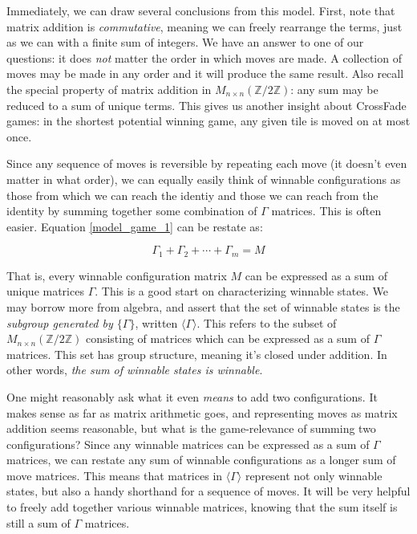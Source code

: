 \documentclass{article}[12pt]
\newcommand{\group}[1]{M_{#1 \times #1}(\mathbb{Z}/2\mathbb{Z})}
\begin{document}
Immediately, we can draw several conclusions from this model.  First, note that matrix addition is \emph{commutative}, meaning we can freely rearrange the terms, just as we can with a finite sum of integers.  We have an answer to one of our questions: it does \emph{not} matter the order in which moves are made.  A collection of moves may be made in any order and it will produce the same result.  Also recall the special property of matrix addition in $\group{n}$: any sum may be reduced to a sum of unique terms.  This gives us another insight about CrossFade games: in the shortest potential winning game, any given tile is moved on at most once.

Since any sequence of moves is reversible by repeating each move (it doesn't even matter in what order), we can equally easily think of winnable configurations as those from which we can reach the identiy and those we can reach from the identity by summing together some combination of $\Gamma$ matrices.  This is often easier.  Equation \ref{model_game_1} can be restate as:

\begin{equation}
\label{model_game_2}
\Gamma_1 + \Gamma_2 + \cdots + \Gamma_m = M
\end{equation}

That is, every winnable configuration matrix $M$ can be expressed as a sum of unique matrices $\Gamma$.  This is a good start on characterizing winnable states.  We may borrow more from algebra, and assert that the set of winnable states is the \emph{subgroup generated by $\{\Gamma\}$}, written $\langle\Gamma\rangle$.  This refers to the subset of $\group{n}$ consisting of matrices which can be expressed as a sum of $\Gamma$ matrices.  This set has group structure, meaning it's closed under addition.  In other words, \emph{the sum of winnable states is winnable}.

One might reasonably ask what it even \emph{means} to add two configurations.  It makes sense as far as matrix arithmetic goes, and representing moves as matrix addition seems reasonable, but what is the game-relevance of summing two configurations?  Since any winnable matrices can be expressed as a sum of $\Gamma$ matrices, we can restate any sum of winnable configurations as a longer sum of move matrices.  This means that matrices in $\langle\Gamma\rangle$ represent not only winnable states, but also a handy shorthand for a sequence of moves.  It will be very helpful to freely add together various winnable matrices, knowing that the sum itself is still a sum of $\Gamma$ matrices.
\end{document}
